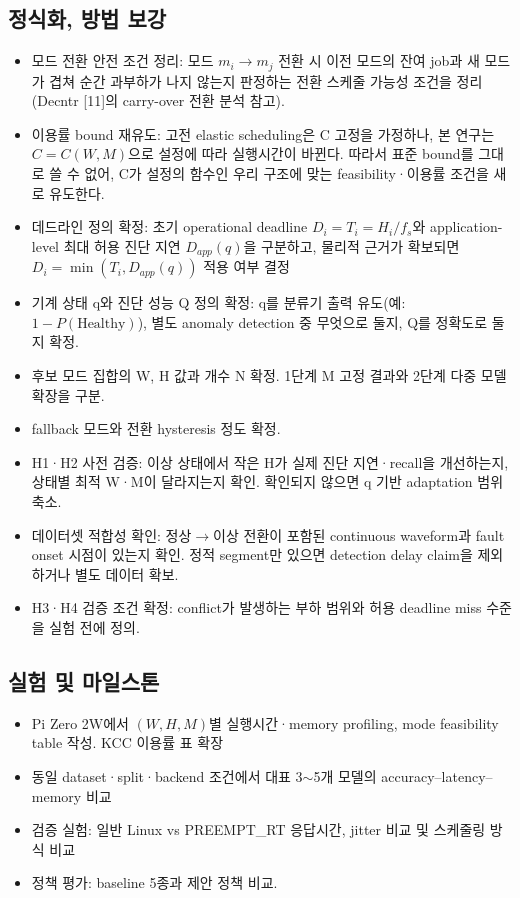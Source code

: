 \documentclass[10pt]{article}
\begin{document}
\subsection{정식화, 방법 보강}
\begin{itemize}
\item[$\square$] 모드 전환 안전 조건 정리: 모드 $m_i \rightarrow m_j$ 전환 시 이전 모드의 잔여 job과 새 모드가 겹쳐 순간 과부하가 나지 않는지 판정하는 전환 스케줄 가능성 조건을 정리 (Decntr [11]의 carry-over 전환 분석 참고).
\item[$\square$] 이용률 bound 재유도: 고전 elastic scheduling은 C 고정을 가정하나, 본 연구는 $C = C(W, M)$으로 설정에 따라 실행시간이 바뀐다. 따라서 표준 bound를 그대로 쓸 수 없어, C가 설정의 함수인 우리 구조에 맞는 feasibility·이용률 조건을 새로 유도한다.
\item[$\square$] 데드라인 정의 확정: 초기 operational deadline $D_i=T_i=H_i/f_s$와 application-level 최대 허용 진단 지연 $D_{app}(q)$을 구분하고, 물리적 근거가 확보되면 $D_i=\min(T_i,D_{app}(q))$ 적용 여부 결정
\item[$\square$] 기계 상태 q와 진단 성능 Q 정의 확정: q를 분류기 출력 유도(예: $1-P(\text{Healthy})$), 별도 anomaly detection 중 무엇으로 둘지, Q를 정확도로 둘지 확정.
\item[$\square$] 후보 모드 집합의 W, H 값과 개수 N 확정. 1단계 M 고정 결과와 2단계 다중 모델 확장을 구분.
\item[$\square$] fallback 모드와 전환 hysteresis 정도 확정.
\item[$\square$] H1·H2 사전 검증: 이상 상태에서 작은 H가 실제 진단 지연·recall을 개선하는지, 상태별 최적 W·M이 달라지는지 확인. 확인되지 않으면 q 기반 adaptation 범위 축소.
\item[$\square$] 데이터셋 적합성 확인: 정상$\rightarrow$이상 전환이 포함된 continuous waveform과 fault onset 시점이 있는지 확인. 정적 segment만 있으면 detection delay claim을 제외하거나 별도 데이터 확보.
\item[$\square$] H3·H4 검증 조건 확정: conflict가 발생하는 부하 범위와 허용 deadline miss 수준을 실험 전에 정의.
\end{itemize}
\subsection{실험 및 마일스톤}
\begin{itemize}
\item[$\square$] Pi Zero 2W에서 $(W,H,M)$별 실행시간·memory profiling, mode feasibility table 작성. KCC 이용률 표 확장
\item[$\square$] 동일 dataset·split·backend 조건에서 대표 3$\sim$5개 모델의 accuracy--latency--memory 비교
\item[$\square$] 검증 실험: 일반 Linux vs PREEMPT\_RT 응답시간, jitter 비교 및 스케줄링 방식 비교
\item[$\square$] 정책 평가: baseline 5종과 제안 정책 비교.
\end{itemize}
\end{document}
